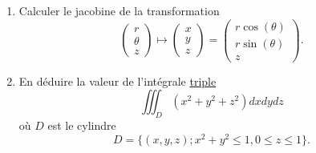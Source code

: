 
\begin{exercice}\label{exoOutilsMath-0129}

    \begin{enumerate}
        \item
            Calculer le jacobine de la transformation
            \begin{equation}
                \begin{pmatrix}
                    r    \\ 
                    \theta    \\ 
                    z    
                \end{pmatrix}\mapsto
                \begin{pmatrix}
                    x    \\ 
                    y    \\ 
                    z    
                \end{pmatrix}=\begin{pmatrix}
                    r\cos(\theta)    \\ 
                    r\sin(\theta)    \\ 
                    z    
                \end{pmatrix}.
            \end{equation}
        \item
            En déduire la valeur de l'intégrale \href{http://fr.wikipedia.org/wiki/Fichier:Westmalle_Tripel.jpg}{triple}
            \begin{equation}
                \iiint_D(x^2+y^2+z^2)dxdydz
            \end{equation}
            où \( D\) est le cylindre
            \begin{equation}
                D=\{ (x,y,z); x^2+y^2\leq 1,0\leq z\leq 1 \}.
            \end{equation}

    \end{enumerate}

\end{exercice}
